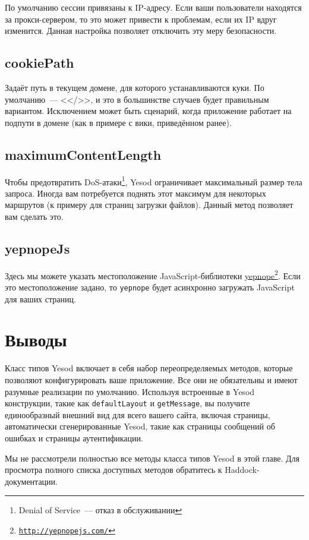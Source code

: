 По умолчанию сессии привязаны к IP-адресу. Если ваши пользователи находятся за прокси-сервером, то это может привести к проблемам, если их IP вдруг изменится. Данная настройка позволяет отключить эту меру безопасности.

\subsection {cookiePath}

Задаёт путь в текущем домене, для которого устанавливаются куки. По умолчанию~--- <</>>, и это в большинстве случаев будет правильным вариантом. Исключением может быть сценарий, когда приложение работает на подпути в домене (как в примере с вики, приведённом ранее).

\subsection {maximumContentLength}

Чтобы предотвратить DoS-атаки\footnote{Denial of Service~--- отказ в обслуживании}, Yesod ограничивает максимальный размер тела запроса.  Иногда вам потребуется поднять этот максимум для некоторых маршрутов (к примеру для страниц загрузки файлов). Данный метод позволяет вам сделать это.

\subsection {yepnopeJs}

Здесь мы можете указать местоположение JavaScript-библиотеки \href{http://yepnopejs.com/}{yepnope}\footnote{\href{http://yepnopejs.com/}{\texttt{http://yepnopejs.com/}}}. Если это местоположение задано, то \lstinline!yepnope! будет асинхронно загружать JavaScript для ваших страниц.

\section {Выводы}

Класс типов Yesod включает в себя набор переопределяемых методов, которые позволяют конфигурировать ваше приложение. Все они не обязательны и имеют разумные реализации по умолчанию. Используя встроенные в Yesod конструкции, такие как \lstinline!defaultLayout! и \lstinline!getMessage!, вы получите единообразный внешний вид для всего вашего сайта, включая страницы, автоматически сгенерированные Yesod, такие как страницы сообщений об ошибках и страницы аутентификации.

Мы не рассмотрели полностью все методы класса типов Yesod в этой главе. Для просмотра полного списка доступных методов обратитесь к Haddock-документации.
